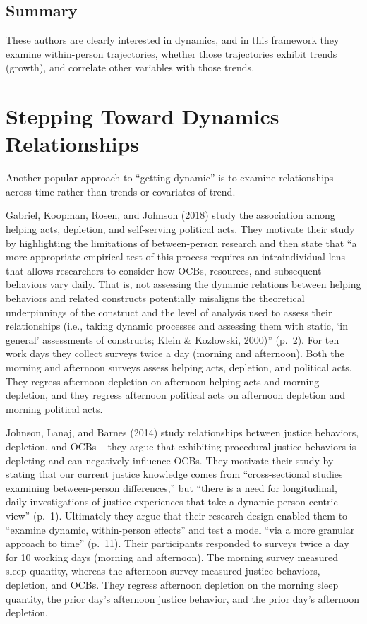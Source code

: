 \documentclass[english,,man]{apa6}
\theoremstyle{definition}
\theoremstyle{definition}
\theoremstyle{definition}
\theoremstyle{remark}
\begin{document}
\hypertarget{summary}{%
\subsection{Summary}\label{summary}}

These authors are clearly interested in dynamics, and in this framework
they examine within-person trajectories, whether those trajectories
exhibit trends (growth), and correlate other variables with those
trends.

\hypertarget{stepping-toward-dynamics-relationships}{%
\section{Stepping Toward Dynamics --
Relationships}\label{stepping-toward-dynamics-relationships}}

Another popular approach to \enquote{getting dynamic} is to examine
relationships across time rather than trends or covariates of trend.

Gabriel, Koopman, Rosen, and Johnson (2018) study the association among
helping acts, depletion, and self-serving political acts. They motivate
their study by highlighting the limitations of between-person research
and then state that \enquote{a more appropriate empirical test of this
process requires an intraindividual lens that allows researchers to
consider how OCBs, resources, and subsequent behaviors vary daily. That
is, not assessing the dynamic relations between helping behaviors and
related constructs potentially misaligns the theoretical underpinnings
of the construct and the level of analysis used to assess their
relationships (i.e., taking dynamic processes and assessing them with
static, \enquote{in general} assessments of constructs; Klein \&
Kozlowski, 2000)} (p.~2). For ten work days they collect surveys twice a
day (morning and afternoon). Both the morning and afternoon surveys
assess helping acts, depletion, and political acts. They regress
afternoon depletion on afternoon helping acts and morning depletion, and
they regress afternoon political acts on afternoon depletion and morning
political acts.

Johnson, Lanaj, and Barnes (2014) study relationships between justice
behaviors, depletion, and OCBs -- they argue that exhibiting procedural
justice behaviors is depleting and can negatively influence OCBs. They
motivate their study by stating that our current justice knowledge comes
from \enquote{cross-sectional studies examining between-person
differences,} but \enquote{there is a need for longitudinal, daily
investigations of justice experiences that take a dynamic person-centric
view} (p.~1). Ultimately they argue that their research design enabled
them to \enquote{examine dynamic, within-person effects} and test a
model \enquote{via a more granular approach to time} (p.~11). Their
participants responded to surveys twice a day for 10 working days
(morning and afternoon). The morning survey measured sleep quantity,
whereas the afternoon survey measured justice behaviors, depletion, and
OCBs. They regress afternoon depletion on the morning sleep quantity,
the prior day's afternoon justice behavior, and the prior day's
afternoon depletion.
\end{document}
